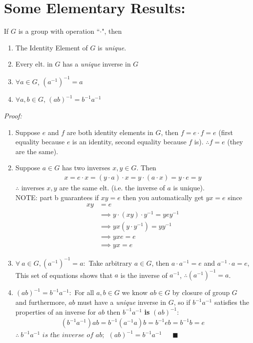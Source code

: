 \section{Some Elementary Results:}
\begin{lemma}
If $G$ is a group with operation ``$\cdot$", then
\begin{enumerate}[label=\alph*)]
    \item The Identity Element of $G$ is \textit{unique}.
    \item Every elt. in $G$ has a \textit{unique} inverse in $G$
    \item $\forall a \in G$, $(a^{-1})^{-1}=a$
    \item $\forall a,b \in G$, $(ab)^{-1}=b^{-1}a^{-1}$
\end{enumerate}
\textit{Proof:}
\begin{enumerate}[label=\alph*)]
    \item Suppose $e$ and $f$ are both identity elements in $G$, then $f=e\cdot f=e$ (first equality
    because $e$ is an identity, second equality because $f$ is). $\therefore f=e$ (they are the
    same).
    \item Suppose $a\in G$ has two inverses $x,y \in G$. Then
    \begin{align}
        x=e\cdot x=(y\cdot a)\cdot x = y\cdot(a\cdot x)=y\cdot e=y\nonumber
    \end{align}
    $\therefore $ inverses $x,y$ are the same elt. (i.e. the inverse of $a$ is unique).\\
    \noindent NOTE: part b guarantees if $xy=e$ then you automatically get $yx=e$ since
    \begin{align}
        xy&=e \nonumber \\
        &\implies y\cdot (xy)\cdot y^{-1} = yey^{-1} \nonumber \\
        &\implies yx(y\cdot y^{-1})= yy^{-1} \nonumber \\
        &\implies yxe=e \nonumber \\
        &\implies yx=e \nonumber
    \end{align}
    \item $\forall \ a \in G, (a^{-1})^{-1}=a:$ Take arbitrary $a\in G$, then $a\cdot a^{-1}=e$ and
    $a^{-1}\cdot a= e$, This set of equations shows that $a$ is the inverse of $a^{-1}$,
    $\therefore (a^{-1})^{-1}=a$.
    \item $(ab)^{-1}=b^{-1}a^{-1}:$ For all $a,b\in G$ we know $ab\in G$ by closure of group $G$ and
    furthermore, $ab$ must have a \textit{unique} inverse in $G$, so if $b^{-1}a^{-1}$ satisfies the
    properties of an inverse for $ab$ then $b^{-1}a^{-1}$ \textbf{is} $(ab)^{-1}$:
    \begin{align}
        (b^{-1}a^{-1})ab= b^{-1}(a^{-1}a)b=b^{-1}eb=b^{-1}b=e \nonumber
    \end{align}
    $\therefore \ b^{-1}a^{-1} \textit{ is the inverse of } ab; \ \ (ab)^{-1}=b^{-1}a^{-1} \ \ \ \ \ \ \ \blacksquare$
\end{enumerate}
\end{lemma}

